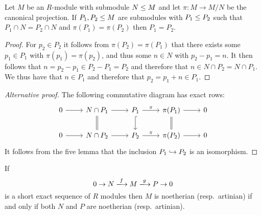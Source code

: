 \begin{lemma}
  \label{lemma: noether artinian ses preparation}
  Let $M$ be an $R$-module with submodule $N \leq M$ and let $\pi \colon M \to M/N$ be the canonical projection.
  If $P_1, P_2 \leq M$ are submodules with $P_1 \leq P_2$ such that $P_1 \cap N = P_2 \cap N$ and $\pi(P_1) = \pi(P_2)$ then $P_1 = P_2$.
\end{lemma}


\begin{proof}
  For $p_2 \in P_2$ it follows from $\pi(P_2) = \pi(P_1)$ that there exists some $p_1 \in P_1$ with $\pi(p_1) = \pi(p_2)$, and thus some $n \in N$ with $p_2 - p_1 = n$.
  It then follows that $n = p_2 - p_1 \in P_2 - P_1 = P_2$ and therefore that $n \in N \cap P_2 = N \cap P_1$.
  We thus have that $n \in P_1$ and therefore that $p_2 = p_1 + n \in P_1$.
\end{proof}


\begin{proof}[Alternative proof]
  The following commutative diagram has exact rows:
  \[
    \begin{tikzcd}
        0
        \arrow{r}
      & N \cap P_1
        \arrow{r}
        \arrow[equal]{d}
      & P_1
        \arrow{r}{\pi}
        \arrow[hook]{d}
      & \pi(P_1)
        \arrow{r}
        \arrow[equal]{d}
      & 0
      \\
        0
        \arrow{r}
      & N \cap P_2
        \arrow{r}
      & P_2
        \arrow{r}{\pi}
      & \pi(P_2)
        \arrow{r}
      & 0
    \end{tikzcd}
  \]
  It follows from the five lemma that the inclusion $P_1 \hookrightarrow P_2$ is an isomorphism.
\end{proof}


\begin{proposition}
  \label{proposition: noether artin ses}
  If
  \begin{equation}
    \label{equation: original ses for notherian}
                        0
    \to                 N
    \xlongrightarrow{f} M
    \xlongrightarrow{g} P
    \to                 0
  \end{equation}
  is a short exact sequence of $R$ modules then $M$ is noetherian (resp.\ artinian) if and only if both $N$ and $P$ are noetherian (resp.\ artinian).
\end{proposition}


